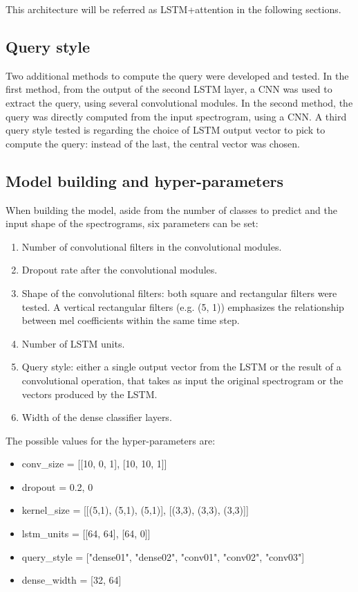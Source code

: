 This architecture will be referred as LSTM+attention in the following sections.

\subsection{Query style}

Two additional methods to compute the query were developed and tested.
In the first method, from the output of the second LSTM layer, a CNN was used
to extract the query, using several convolutional modules.
In the second method, the query was directly computed from the input
spectrogram, using a CNN.
A third query style tested is regarding the choice of LSTM output vector to
pick to compute the query: instead of the last, the central vector was chosen.


\subsection{Model building and hyper-parameters}

When building the model, aside from the number of classes to predict and the
input shape of the spectrograms, six parameters can be set:
\begin{enumerate}
    \item Number of convolutional filters in the convolutional modules.
    \item Dropout rate after the convolutional modules.
    \item Shape of the convolutional filters:
        both square and rectangular filters were tested.
        A vertical rectangular filters (e.g. (5, 1)) emphasizes the
        relationship between mel coefficients within the same time step.
    \item Number of LSTM units.
    \item Query style: either a single output vector from the LSTM or the
        result of a convolutional operation, that takes as input the original
        spectrogram or the vectors produced by the LSTM.
    \item Width of the dense classifier layers.
\end{enumerate}
The possible values for the hyper-parameters are:
\begin{itemize}
    \item conv\_size = [[10, 0, 1], [10, 10, 1]]
    \item dropout = {0.2, 0}
    \item kernel\_size = [[(5,1), (5,1), (5,1)], [(3,3), (3,3), (3,3)]]
    \item lstm\_units = [[64, 64], [64, 0]]
    \item query\_style = ["dense01", "dense02", "conv01", "conv02", "conv03"]
    \item dense\_width = [32, 64]
\end{itemize}

